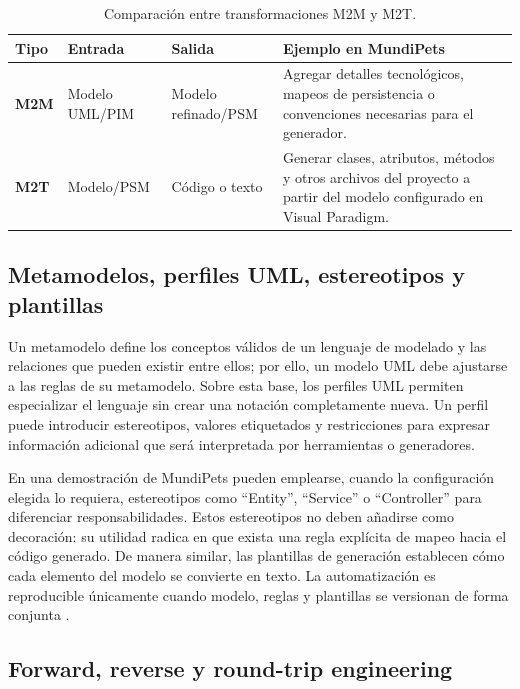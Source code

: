 \documentclass[journal,onecolumn]{IEEEtran}
\begin{document}
	\begin{table}[H]
		\caption{Comparación entre transformaciones M2M y M2T.}
		\label{tab:m2m_m2t}
		\centering
		\begin{tabularx}{\linewidth}{|C{1.2cm}|L{2.6cm}|L{2.6cm}|X|}
			\hline
			\textbf{Tipo} & \textbf{Entrada} & \textbf{Salida} & \textbf{Ejemplo en MundiPets} \\
			\hline
			\textbf{M2M} & Modelo UML/PIM & Modelo refinado/PSM & Agregar detalles tecnológicos, mapeos de persistencia o convenciones necesarias para el generador. \\
			\hline
			\textbf{M2T} & Modelo/PSM & Código o texto & Generar clases, atributos, métodos y otros archivos del proyecto a partir del modelo configurado en Visual Paradigm. \\
			\hline
		\end{tabularx}
	\end{table}
	
	\subsection{Metamodelos, perfiles UML, estereotipos y plantillas}
	
	Un metamodelo define los conceptos válidos de un lenguaje de modelado y las relaciones que pueden existir entre ellos; por ello, un modelo UML debe ajustarse a las reglas de su metamodelo. Sobre esta base, los perfiles UML permiten especializar el lenguaje sin crear una notación completamente nueva. Un perfil puede introducir estereotipos, valores etiquetados y restricciones para expresar información adicional que será interpretada por herramientas o generadores.
	
	En una demostración de MundiPets pueden emplearse, cuando la configuración elegida lo requiera, estereotipos como \enquote{Entity}, \enquote{Service} o \enquote{Controller} para diferenciar responsabilidades. Estos estereotipos no deben añadirse como decoración: su utilidad radica en que exista una regla explícita de mapeo hacia el código generado. De manera similar, las plantillas de generación establecen cómo cada elemento del modelo se convierte en texto. La automatización es reproducible únicamente cuando modelo, reglas y plantillas se versionan de forma conjunta \cite{sebastian2020codegen, diruscio2022lowcode, david2023collaborative}.
	
	\subsection{Forward, reverse y round-trip engineering}
	
\end{document}
